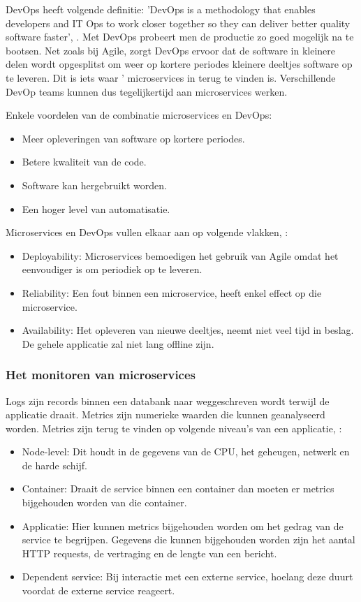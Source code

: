 DevOps heeft volgende definitie: 'DevOps is a methodology that enables developers and IT Ops to work closer together so they can deliver better quality software faster', \textcite{Morgan2019}. Met DevOps probeert men de productie zo goed mogelijk na te bootsen. Net zoals bij Agile, zorgt DevOps ervoor dat de software in kleinere delen wordt opgesplitst om weer op kortere periodes kleinere deeltjes software op te leveren. Dit is iets waar ' microservices in terug te vinden is. Verschillende DevOp teams kunnen dus tegelijkertijd aan microservices  werken.

Enkele voordelen van de combinatie microservices en DevOps:
\begin{itemize}
	\item Meer opleveringen van software op kortere periodes.
	\item Betere kwaliteit van de code.
	\item Software kan hergebruikt worden.
	\item Een hoger level van automatisatie.
\end{itemize}

Microservices en DevOps vullen elkaar aan op volgende vlakken, \textcite{Mulesoft2019}:
\begin{itemize}
	\item Deployability: Microservices bemoedigen het gebruik van Agile omdat het eenvoudiger is om periodiek op te leveren. 
	\item Reliability: Een fout binnen een microservice, heeft enkel effect op die microservice. 
	\item Availability: Het opleveren van nieuwe  deeltjes, neemt niet veel tijd in beslag. De gehele applicatie zal niet lang offline zijn.
\end{itemize}




\subsubsection{Het monitoren van microservices}
Logs zijn records binnen een databank naar weggeschreven wordt terwijl de applicatie draait. Metrics zijn numerieke waarden die kunnen geanalyseerd worden. Metrics zijn terug te vinden op volgende niveau's van een applicatie, \textcite{Wasson2018}:
\begin{itemize}
	\item Node-level: Dit houdt in de gegevens van de CPU, het geheugen, netwerk en de harde schijf. 
	\item Container: Draait de service binnen een container dan moeten er metrics bijgehouden worden van die container. 
	\item Applicatie: Hier kunnen metrics bijgehouden worden om het gedrag van de service te begrijpen. Gegevens die kunnen bijgehouden worden zijn het aantal HTTP requests, de vertraging en de lengte van een bericht.
	\item Dependent service: Bij interactie met een externe service, hoelang deze duurt voordat de externe service reageert. 
\end{itemize}


